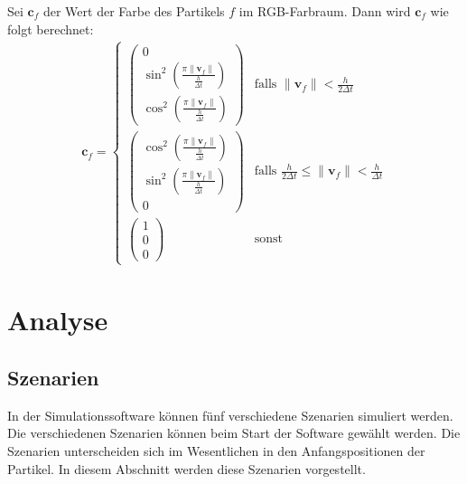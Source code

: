 \documentclass{scrreprt}
\begin{document}
Sei $\textbf{c}_f$ der Wert der Farbe des Partikels $f$ im RGB-Farbraum.
Dann wird $\textbf{c}_f$ wie folgt berechnet:
\begin{align}
    \textbf{c}_f = \begin{cases}
        \begin{pmatrix}
            0\\
            \sin^2(\frac{\pi \|\textbf{v}_f\|}{\frac{h}{\Delta t}})\\
            \cos^2(\frac{\pi \|\textbf{v}_f\|}{\frac{h}{\Delta t}})
        \end{pmatrix}
        & \text{falls } \|\textbf{v}_f\| < \frac{h}{2\Delta t}\\[25pt]
        \begin{pmatrix}
            \cos^2(\frac{\pi \|\textbf{v}_f\|}{\frac{h}{\Delta t}})\\
            \sin^2(\frac{\pi \|\textbf{v}_f\|}{\frac{h}{\Delta t}})\\
            0
        \end{pmatrix}
        & \text{falls } \frac{h}{2\Delta t} \leq \|\textbf{v}_f\| < \frac{h}{\Delta t}\\[25pt]
        \begin{pmatrix}
            1\\
            0\\
            0
        \end{pmatrix}
        & \text{sonst}
    \end{cases}
\end{align}



\chapter{Analyse}


\section{Szenarien}
In der Simulationssoftware können fünf verschiedene Szenarien simuliert werden.
Die verschiedenen Szenarien können beim Start der Software gewählt werden.
Die Szenarien unterscheiden sich im Wesentlichen in den Anfangspositionen der Partikel.
In diesem Abschnitt werden diese Szenarien vorgestellt.
\end{document}
